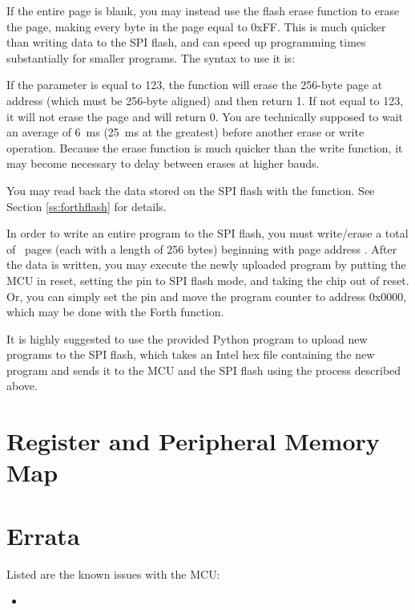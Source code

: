 \documentclass[11pt,pdftex,portrait,letterpaper]{article}
\begin{document}
If the entire page is blank, you may instead use the flash erase  function to erase the page, making every byte in the page equal to 0xFF. This is much quicker than writing data to the SPI flash, and can speed up programming times substantially for smaller programs. The syntax to use it is:

\noindent{}

If the  parameter is equal to 123, the function will erase the 256-byte page at address  (which must be 256-byte aligned) and then return 1. If not equal to 123, it will not erase the page and will return 0. You are technically supposed to wait an average of 6~ms (25~ms at the greatest) before another erase or write operation. Because the erase function is much quicker than the write function, it may become necessary to delay between erases at higher bauds.

You may read back the data stored on the SPI flash with the  function. See Section \ref{ss:forthflash} for details.

In order to write an entire program to the SPI flash, you must write/erase a total of \RamNumPages\ pages (each with a length of 256 bytes) beginning with page address \RamStartAddress. After the data is written, you may execute the newly uploaded program by putting the MCU in reset, setting the  pin to SPI flash mode, and taking the chip out of reset. Or, you can simply set the  pin and move the program counter to address 0x0000, which may be done with the  Forth function.

It is highly suggested to use the provided Python program  to upload new programs to the SPI flash, which takes an Intel hex file containing the new program and sends it to the MCU and the SPI flash using the process described above.

\newpage







\section{Register and Peripheral Memory Map} \label{s:regMemMap}


\newpage

\section{Errata} \label{s:errata}
Listed are the known issues with the {\AsicNameForUserGuide} MCU:

\begin{itemize}
	\item 
\end{itemize}
\end{document}
